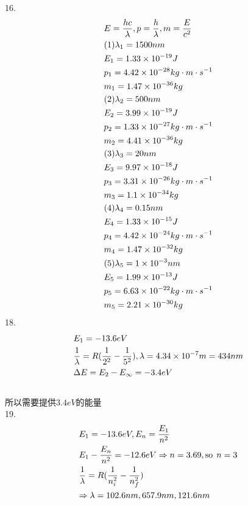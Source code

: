\documentclass{article}
\begin{document}
16.\[\begin{gathered}
E = \frac{{hc}}{\lambda },p = \frac{h}{\lambda },m = \frac{E}{{{c^2}}} \hfill \\
(1){\lambda _1} = 1500nm \hfill \\
{E_1} = 1.33 \times {10^{ - 19}}J \hfill \\
{p_1} = 4.42 \times {10^{ - 28}}kg \cdot m \cdot {s^{ - 1}} \hfill \\
{m_1} = 1.47 \times {10^{ - 36}}kg \hfill \\
(2){\lambda _2} = 500nm \hfill \\
{E_2} = 3.99 \times {10^{ - 19}}J \hfill \\
{p_2} = 1.33 \times {10^{ - 27}}kg \cdot m \cdot {s^{ - 1}} \hfill \\
{m_2} = 4.41 \times {10^{ - 36}}kg \hfill \\
(3){\lambda _3} = 20nm \hfill \\
{E_3} = 9.97 \times {10^{ - 18}}J \hfill \\
{p_3} = 3.31 \times {10^{ - 26}}kg \cdot m \cdot {s^{ - 1}} \hfill \\
{m_3} = 1.1 \times {10^{ - 34}}kg \hfill \\
(4){\lambda _4} = 0.15nm \hfill \\
{E_4} = 1.33 \times {10^{ - 15}}J \hfill \\
{p_4} = 4.42 \times {10^{ - 24}}kg \cdot m \cdot {s^{ - 1}} \hfill \\
{m_4} = 1.47 \times {10^{ - 32}}kg \hfill \\
(5){\lambda _5} = 1 \times {10^{ - 3}}nm \hfill \\
{E_5} = 1.99 \times {10^{ - 13}}J \hfill \\
{p_5} = 6.63 \times {10^{ - 22}}kg \cdot m \cdot {s^{ - 1}} \hfill \\
{m_5} = 2.21 \times {10^{ - 30}}kg \hfill \\ 
\end{gathered} \]
18.\[\begin{gathered}
{E_1} =  - 13.6eV \hfill \\
\frac{1}{\lambda } = R(\frac{1}{{{2^2}}} - \frac{1}{{{5^2}}}),\lambda  = 4.34 \times {10^{ - 7}}m = 434nm \hfill \\
\Delta E = {E_2} - {E_\infty } =  - 3.4eV \hfill \\
\hfill \\ 
\end{gathered} \]
所以需要提供$3.4eV$的能量\\
19.\[\begin{gathered}
{E_1} =  - 13.6eV,{E_n} = \frac{{{E_1}}}{{{n^2}}} \hfill \\
{E_1} - \frac{{{E_n}}}{{{n^2}}} =  - 12.6eV \Rightarrow n = 3.69,{\text{so }}{\kern 1pt} n = 3 \hfill \\
\frac{1}{\lambda } = R(\frac{1}{{n_i^2}} - \frac{1}{{n_f^2}}) \hfill \\
\Rightarrow \lambda  = 102.6nm,657.9nm,121.6nm \hfill \\ 
\end{gathered} \]
\end{document}
